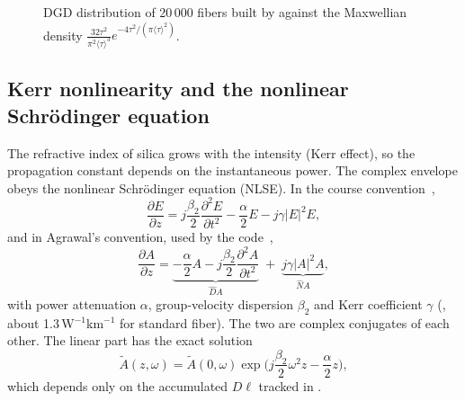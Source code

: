 \begin{figure}[htbp]
\centering
{}
\caption{DGD distribution of 20\,000 fibers built by  against the Maxwellian
density $\frac{32\tau^2}{\pi^2\langle\tau\rangle^3}e^{-4\tau^2/(\pi\langle\tau\rangle^2)}$.}
\label{fig:pmd}
\end{figure}

\subsection{Kerr nonlinearity and the nonlinear Schrödinger equation}\label{sec:nlse}
The refractive index of silica grows with the intensity (Kerr effect), so the propagation
constant depends on the instantaneous power. The complex envelope obeys the nonlinear
Schrödinger equation (NLSE). In the course convention~\cite{ofcnotes},
\begin{equation}
  \frac{\partial E}{\partial z}=j\frac{\beta_2}{2}\frac{\partial^2E}{\partial t^2}-\frac{\alpha}{2}E-j\gamma|E|^2E,
\end{equation}
and in Agrawal's convention, used by the code~\cite{agrawal2019},
\begin{equation}
  \frac{\partial A}{\partial z}=
  \underbrace{-\frac{\alpha}{2}A-j\frac{\beta_2}{2}\frac{\partial^2A}{\partial t^2}}_{\hat D A}
  \;+\;\underbrace{j\gamma|A|^2A}_{\hat N A},
  \label{eq:nlse}
\end{equation}
with power attenuation $\alpha$, group-velocity dispersion $\beta_2$ and Kerr coefficient $\gamma$
(, about 1.3\,W$^{-1}$km$^{-1}$ for standard fiber). The two are complex conjugates of each
other. The linear part has the exact solution
\begin{equation}
  \tilde A(z,\omega)=\tilde A(0,\omega)\exp\!\Big(j\frac{\beta_2}{2}\omega^2z-\frac{\alpha}{2}z\Big),
  \label{eq:dispersion-operator}
\end{equation}
which depends only on the accumulated $D\ell$ tracked in .

